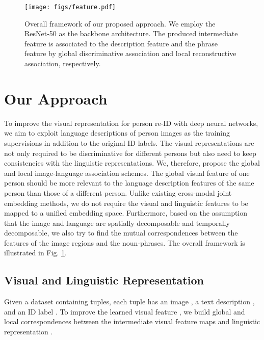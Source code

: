 \documentclass[runningheads]{llncs}
\begin{document}
\begin{figure}[t]
\vspace{-1em}
\centering
\texttt{[image: figs/feature.pdf]}
\vspace{-1em}
\caption{Overall framework of our proposed approach. We employ the ResNet-50 as the backbone architecture. The produced intermediate feature  is associated to the description feature  and the phrase feature  by global discriminative association and local reconstructive association, respectively.}  \label{Overall_framework}
\vspace{-1em}
\end{figure}


\section{Our Approach}



To improve the visual representation for person re-ID with deep neural networks, we aim to exploit language descriptions of person images as the training supervisions in addition to the original ID labels. The visual representations are not only required to be discriminative for different persons but also need to keep consistencies with the linguistic representations. We, therefore,  propose the global and local image-language association schemes. The global visual feature of one person should be more relevant to the language description features of the same person than those of a different person. Unlike existing cross-modal joint embedding methods, we do not require the visual and linguistic features to be mapped to a unified embedding space. Furthermore, based on the assumption that the image and language are spatially decomposable and temporally decomposable, we also try to find the mutual correspondences between the features of the image regions and the noun-phrases. The overall framework is illustrated in Fig. 
\ref{Overall_framework}.




\subsection{Visual and Linguistic Representation}

Given a dataset  containing  tuples, each tuple has an image , a text description , and an ID label . To improve the learned visual feature , we build global and local correspondences between the intermediate visual feature maps  and linguistic representation . 
\end{document}
